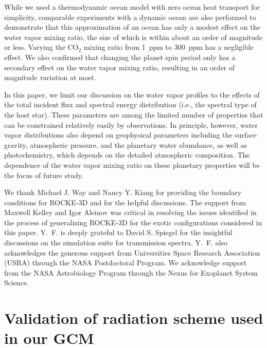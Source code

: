\documentclass[11pt,numberedappendix,twocolappendix,]{emulateapj}
\def\modelE{ROCKE-3D}
\def\wv{water vapor}
\begin{document}
While we used a thermodynamic ocean model with zero ocean heat transport for simplicity, comparable experiments with a dynamic ocean are also performed to demonstrate that this approximation of an ocean has only a modest effect on the \wv{} mixing ratio, the size of which is within about an order of magnitude or less. 
Varying the CO$_2$ mixing ratio from 1~ppm to 300~ppm has a negligible effect. 
We also confirmed that changing the planet spin period only has a secondary effect on the \wv{} mixing ratio, resulting in an order of magnitude variation at most. 

In this paper, we limit our discussion on the \wv{} profiles to the effects of the total incident flux and spectral energy distribution (i.e., the spectral type of the host star). 
These parameters are among the limited number of properties that can be constrained relatively easily by observations. 
In principle, however, \wv{} distributions also depend on geophysical parameters including the surface gravity, atmospheric pressure, and the planetary water abundance, as well as photochemistry, which depends on the detailed atmospheric composition. 
The dependence of the \wv{} mixing ratio on these planetary properties will be  the focus of future study. 



\acknowledgments
We thank Michael J. Way and Nancy Y. Kiang for providing the boundary conditions for \modelE{} and for the helpful discussions. 
The support from Maxwell Kelley and Igor Aleinov was critical in resolving the issues identified in the process of generalizing \modelE{} for the exotic configurations considered in this paper. 
Y.~F. is deeply grateful to David S. Spiegel for the insightful discussions on the simulation suite for transmission spectra. 
Y.~F. also acknowledges the generous support from Universities Space Research Association (USRA) through the NASA Postdoctoral Program. 
We acknowledge support from the NASA Astrobiology Program through the Nexus for Exoplanet System Science.




\appendix


\section{Validation of radiation scheme used in our GCM}
\label{ap:radiation}
\end{document}
